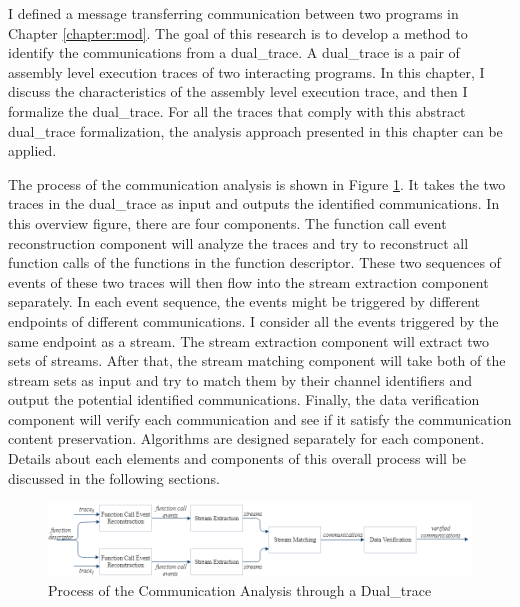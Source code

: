 


\label{chapter:alo}
I defined a message transferring communication between two programs in Chapter \ref{chapter:mod}. The goal of this research is to develop a method to identify the communications from a dual\_trace. A dual\_trace is a pair of assembly level execution traces of two interacting programs. In this chapter, I discuss the characteristics of the assembly level execution trace, and then I formalize the dual\_trace. For all the traces that comply with this abstract dual\_trace formalization, the analysis approach presented in this chapter can be applied.


The process of the communication analysis is shown in Figure \ref{overview}. It takes the two traces in the dual\_trace as input and outputs the identified communications. In this overview figure, there are four components. The function call event reconstruction component will analyze the traces and try to reconstruct all function calls of the functions in the function descriptor. These two sequences of events of these two traces will then flow into the stream extraction component separately. In each event sequence, the events might be triggered by different endpoints of different communications. I consider all the events triggered by the same endpoint as a stream. The stream extraction component will extract two sets of streams. After that, the stream matching component will take both of the stream sets as input and try to match them by their channel identifiers and output the potential identified communications. Finally, the data verification component will verify each communication and see if it satisfy the communication content preservation. Algorithms are designed separately for each component. Details about each elements and components of this overall process will be discussed in the following sections.


\begin{figure}[H]
\centerline{\includegraphics[scale=0.5]{Figures/overview}}
\caption{Process of the Communication Analysis through a Dual\_trace}
\label{overview}
\end{figure}

